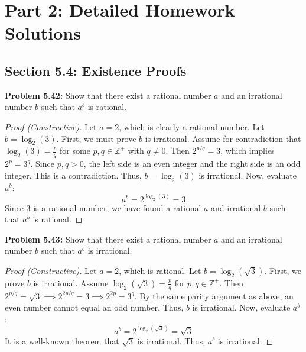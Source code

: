 \documentclass[11pt, a4paper]{article}
\theoremstyle{definition}
\theoremstyle{remark}
\newcommand{\Z}{\mathbb{Z}}
\begin{document}
\newpage

\section{Part 2: Detailed Homework Solutions}

\subsection{Section 5.4: Existence Proofs}

\textbf{Problem 5.42:} Show that there exist a rational number $a$ and an irrational number $b$ such that $a^b$ is rational.
\begin{proof}[Proof (Constructive)]
    Let $a = 2$, which is clearly a rational number. Let $b = \log_2(3)$. 
    First, we must prove $b$ is irrational. Assume for contradiction that $\log_2(3) = \frac{p}{q}$ for some $p, q \in \Z^+$ with $q \neq 0$. Then $2^{p/q} = 3$, which implies $2^p = 3^q$. Since $p, q > 0$, the left side is an even integer and the right side is an odd integer. This is a contradiction. Thus, $b = \log_2(3)$ is irrational.
    Now, evaluate $a^b$:
    \[ a^b = 2^{\log_2(3)} = 3 \]
    Since $3$ is a rational number, we have found a rational $a$ and irrational $b$ such that $a^b$ is rational.
\end{proof}

\textbf{Problem 5.43:} Show that there exist a rational number $a$ and an irrational number $b$ such that $a^b$ is irrational.
\begin{proof}[Proof (Constructive)]
    Let $a = 2$, which is rational. Let $b = \log_2(\sqrt{3})$. 
    First, we prove $b$ is irrational. Assume $\log_2(\sqrt{3}) = \frac{p}{q}$ for $p, q \in \Z^+$. Then $2^{p/q} = \sqrt{3} \implies 2^{2p/q} = 3 \implies 2^{2p} = 3^q$. By the same parity argument as above, an even number cannot equal an odd number. Thus, $b$ is irrational.
    Now, evaluate $a^b$:
    \[ a^b = 2^{\log_2(\sqrt{3})} = \sqrt{3} \]
    It is a well-known theorem that $\sqrt{3}$ is irrational. Thus, $a^b$ is irrational.
\end{proof}
\end{document}
